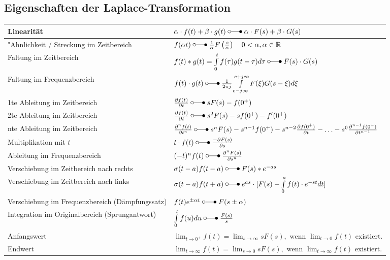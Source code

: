  	\subsection{Eigenschaften der Laplace-Transformation}
  		\renewcommand{\arraystretch}{2}
		\begin{tabular}{|l|l|}
        	\hline
        	Linearität & 
 			$\alpha\cdot f(t) + \beta\cdot g(t) \; \laplace \; \alpha\cdot F(s) + \beta\cdot
 			G(s)$ \\
 			\hline
 			"Ahnlichkeit / Streckung im Zeitbereich &
 			$f(\alpha t) \; \laplace \; \frac{1}{\alpha}F \left (\frac{s}{\alpha} \right ) \quad 0 <\alpha, \alpha \in\mathbb{R}$ \\
 			\hline
 			Faltung im Zeitbereich &
 			$f(t) \ast g(t) = \int\limits_{0}^{t} f(\tau)g(t-\tau)d\tau \; \laplace \; F(s)
 			\cdot G(s)$\\
 			\hline
 			Faltung im Frequenzbereich &
 			$f(t) \cdot g(t) \; \laplace \; \frac{1}{2\pi j}\int\limits_{c-j\infty}^{c+j\infty}
 			F(\xi) G(s-\xi)d\xi$ \\
 			\hline
 			1te Ableitung im Zeitbereich &
 			$\frac{\partial f(t)}{\partial t} \; \laplace \; sF(s)
 			-f(0^+)$ \\
 			\hline
 			2te Ableitung im Zeitbereich &
 			$\frac{\partial f(t)}{\partial t} \; \laplace \; s^2F(s)
 			-sf(0^+) -f'(0^+)$ \\
 			\hline
 			nte Ableitung im Zeitbereich &
 			$\frac{\partial^n f(t)}{\partial t^n} \; \laplace \; s^nF(s)
 			-s^{n-1}f(0^+)-s^{n-2}\frac{\partial f(0^+)}{\partial t}-\ldots
 			-s^0\frac{\partial^{n-1} f(0^+)}{\partial t^{n-1}}$ \\
 			\hline
 			Multiplikation mit $t$ &
 			$t\cdot f(t)  \; \laplace \; \frac{-\partial F(s)}{\partial s}$ \\
 			\hline
 			Ableitung im Frequenzbereich &
 			$(-t)^n f(t) \; \laplace \;  \frac{\partial^n F(s)}{\partial s^n}$ \\
 			\hline
 			Verschiebung im Zeitbereich nach rechts &
 			$\sigma(t-a)f(t - a) \; \laplace \; F(s)*e^{-as}$ \\
 			\hline
			Verschiebung im Zeitbereich nach links &
			$\sigma(t-a)f(t + a) \; \laplace \; e^{as} \cdot [F(s) - \int\limits_0^{a} f(t) \cdot e^{-st} dt]$\\
			\hline
 			Verschiebung im Frequenzbereich (Dämpfungssatz) &
 			$f(t)e^{\pm\alpha t} \; \laplace \; F(s\pm\alpha)$ \\
 			\hline
 			Integration im Originalbereich (Sprungantwort)&
 			$\int\limits_0^t f(u)du \; \laplace \; \frac{F(s)}{s}$ \\
 			\hline
 			Anfangswert &
 			$\lim_{t\rightarrow 0^+} f(t) = \lim_{s\rightarrow \infty} sF(s),\text{~wenn
 			}  \lim_{t\rightarrow 0} f(t)\text{~existiert}.$ \\
 			\hline
 			Endwert &
 			$\lim_{t\rightarrow \infty} f(t) = \lim_{s\rightarrow 0} sF(s),\text{~wenn
 			}  \lim_{t\rightarrow \infty} f(t)\text{~existiert}.$ \\
 			\hline
       	\end{tabular}
		\renewcommand{\arraystretch}{\arraystretchOriginal}
	
